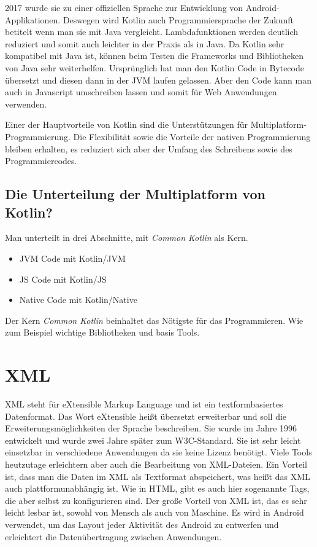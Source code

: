 2017 wurde sie zu einer offiziellen Sprache zur Entwicklung von Android-Applikationen. Deswegen wird Kotlin auch Programmiersprache der Zukunft betitelt wenn man sie mit Java vergleicht.
Lambdafunktionen werden deutlich reduziert und somit auch leichter in der Praxis als in Java. 
Da Kotlin sehr kompatibel mit Java ist, können beim Testen die Frameworks und Bibliotheken von Java sehr weiterhelfen.  
Ursprünglich hat man den Kotlin Code in Bytecode übersetzt und diesen dann in der JVM laufen gelassen. 
Aber den Code kann man auch in Javascript umschreiben lassen und somit für Web Anwendungen verwenden.

Einer der Hauptvorteile von Kotlin sind die Unterstützungen für Multiplatform-Programmierung.
Die Flexibilität  sowie die Vorteile der nativen Programmierung bleiben erhalten, es reduziert sich aber 
der Umfang des Schreibens sowie des Programmiercodes.


\subsection{Die Unterteilung der Multiplatform von Kotlin?}

Man unterteilt in drei Abschnitte, mit \textit{Common Kotlin} als Kern.

\begin{itemize}
    \item JVM Code mit Kotlin/JVM
    \item JS Code mit Kotlin/JS
    \item Native Code mit Kotlin/Native
\end{itemize}

Der Kern \textit{Common Kotlin} beinhaltet das  Nötigste für das Programmieren. Wie zum Beispiel wichtige Bibliotheken
und basis Tools.


\pagebreak

\section{XML}
\cite{XML1}
\cite{XML2}
\author{Bozidar Spasenovic}
XML steht für eXtensible Markup Language und ist ein textformbasiertes Datenformat.
Das Wort eXtensible heißt übersetzt erweiterbar und soll die Erweiterungsmöglichkeiten der Sprache beschreiben.
\linebreak
Sie wurde im Jahre 1996 entwickelt und wurde zwei Jahre später zum W3C-Standard. 
Sie ist sehr leicht einsetzbar in verschiedene Anwendungen da sie keine Lizenz benötigt.
Viele Tools heutzutage erleichtern aber auch die Bearbeitung von XML-Dateien.
\linebreak
Ein Vorteil ist, dass man die Daten im XML als Textformat abspeichert, was heißt das XML auch plattformunabhängig ist.
Wie in HTML, gibt es auch hier sogenannte Tags, die aber selbst zu konfigurieren  sind. 
Der große Vorteil von XML ist, das es sehr leicht lesbar ist, sowohl von Mensch als auch von Maschine.
Es wird in Android verwendet, um das Layout jeder Aktivität des Android zu entwerfen und erleichtert die Datenübertragung zwischen Anwendungen.


